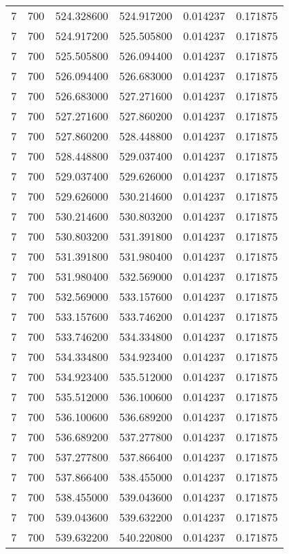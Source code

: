 \begin{longtable}{rrrrrr}
7 & 700 & 524.328600 & 524.917200 & 0.014237 & 0.171875 \\
7 & 700 & 524.917200 & 525.505800 & 0.014237 & 0.171875 \\
7 & 700 & 525.505800 & 526.094400 & 0.014237 & 0.171875 \\
7 & 700 & 526.094400 & 526.683000 & 0.014237 & 0.171875 \\
7 & 700 & 526.683000 & 527.271600 & 0.014237 & 0.171875 \\
7 & 700 & 527.271600 & 527.860200 & 0.014237 & 0.171875 \\
7 & 700 & 527.860200 & 528.448800 & 0.014237 & 0.171875 \\
7 & 700 & 528.448800 & 529.037400 & 0.014237 & 0.171875 \\
7 & 700 & 529.037400 & 529.626000 & 0.014237 & 0.171875 \\
7 & 700 & 529.626000 & 530.214600 & 0.014237 & 0.171875 \\
7 & 700 & 530.214600 & 530.803200 & 0.014237 & 0.171875 \\
7 & 700 & 530.803200 & 531.391800 & 0.014237 & 0.171875 \\
7 & 700 & 531.391800 & 531.980400 & 0.014237 & 0.171875 \\
7 & 700 & 531.980400 & 532.569000 & 0.014237 & 0.171875 \\
7 & 700 & 532.569000 & 533.157600 & 0.014237 & 0.171875 \\
7 & 700 & 533.157600 & 533.746200 & 0.014237 & 0.171875 \\
7 & 700 & 533.746200 & 534.334800 & 0.014237 & 0.171875 \\
7 & 700 & 534.334800 & 534.923400 & 0.014237 & 0.171875 \\
7 & 700 & 534.923400 & 535.512000 & 0.014237 & 0.171875 \\
7 & 700 & 535.512000 & 536.100600 & 0.014237 & 0.171875 \\
7 & 700 & 536.100600 & 536.689200 & 0.014237 & 0.171875 \\
7 & 700 & 536.689200 & 537.277800 & 0.014237 & 0.171875 \\
7 & 700 & 537.277800 & 537.866400 & 0.014237 & 0.171875 \\
7 & 700 & 537.866400 & 538.455000 & 0.014237 & 0.171875 \\
7 & 700 & 538.455000 & 539.043600 & 0.014237 & 0.171875 \\
7 & 700 & 539.043600 & 539.632200 & 0.014237 & 0.171875 \\
7 & 700 & 539.632200 & 540.220800 & 0.014237 & 0.171875 \\

\end{longtable}
